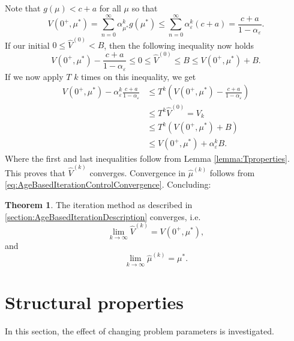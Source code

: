 \documentclass[a4paper]{thesis}
\theoremstyle{definition}
\newtheorem{theorem}{Theorem}[section]
\begin{document}
Note that $g(\mu)<c+a$ for all $\mu$ so that 
$$
V(0^+,\mu^*)=\sum\limits_{n=0}^\infty \alpha_{\mu^*}^kg(\mu^*)\leq \sum\limits_{n=0}^\infty \alpha_\varepsilon^k(c+a)=\frac{c+a}{1-\alpha_\varepsilon}.
$$
If our initial $0\leq \hat{V}^{(0)}<B$, then the following inequality now holds
$$
V(0^+,\mu^*)-\frac{c+a}{1-\alpha_\varepsilon}\leq 0\leq \hat{V}^{(0)}\leq B\leq V(0^+,\mu^*)+B.
$$
If we now apply $T$ $k$ times on this inequality, we get
\[\begin{split}
V(0^+,\mu^*)-\alpha_\varepsilon^k\frac{c+a}{1-\alpha_\varepsilon} &\leq T^k(V(0^+,\mu^*)-\frac{c+a}{1-\alpha_\varepsilon})\\
&\leq  T^k\hat{V}^{(0)}=V_k\\
&\leq T^k(V(0^+,\mu^*)+B) \\
&\leq V(0^+,\mu^*)+\alpha_\varepsilon^kB.
\end{split}\]
Where the first and last inequalities follow from Lemma \ref{lemma:Tproperties}.
This proves that $\hat{V}^{(k)}$ converges.
Convergence in $\hat\mu^{(k)}$ follows from \eqref{eq:AgeBasedIterationControlConvergence}.
Concluding:
\begin{theorem}
	The iteration method as described in \ref*{section:AgeBasedIterationDescription} converges, i.e.
	\[\lim\limits_{k\rightarrow\infty}\hat{V}^{(k)}=V(0^+,\mu^*),\]
	and
	\[\lim\limits_{k\rightarrow\infty}\hat{\mu}^{(k)}=\mu^*.\]
\end{theorem} \section{Structural properties}\label{section:AgeBasedStructuralProperties}
In this section, the effect of changing problem parameters is investigated.
\end{document}
